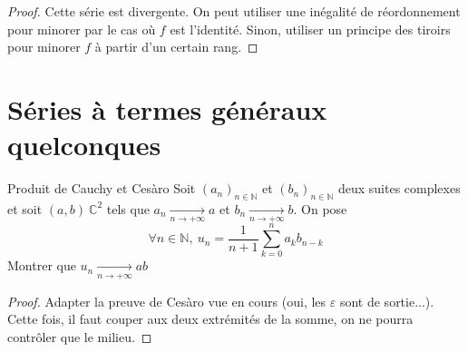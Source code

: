 \documentclass[french,a4paper]{article}
\newcommand{\N}{\mathbb{N}}
\newcommand{\C}{\mathbb{C}}
\theoremstyle{plain}
\theoremstyle{definition}
\theoremstyle{remark}
\begin{document}
\begin{proof}
	Cette série est divergente. On peut utiliser une inégalité de réordonnement pour minorer par le cas où $f$ est l'identité. Sinon, utiliser un principe des tiroirs pour minorer $f$ à partir d'un certain rang. 
\end{proof}

\section{Séries à termes généraux quelconques}

\begin{ex}{Produit de Cauchy et Cesàro}
	Soit $(a_n)_{n \in\N}$ et $(b_n)_{n \in\N}$ deux suites complexes et soit $(a,b) \ \C^2$ tels que $a_n \underset{n \longrightarrow + \infty}{\longrightarrow} a $ et $b_n \underset{n \longrightarrow + \infty}{\longrightarrow} b $. On pose $$\forall n \in \N, \ u_n = \frac{1}{n+1}\sum_{k=0}^{n}a_k b_{n-k} $$ Montrer que $u_n \xrightarrow[n\to+\infty]{} ab$
\end{ex}
\begin{proof}
	Adapter la preuve de Cesàro vue en cours (oui, les $\varepsilon$ sont de sortie...). Cette fois, il faut couper aux deux extrémités de la somme, on ne pourra contrôler que le milieu.
\end{proof}
\end{document}
